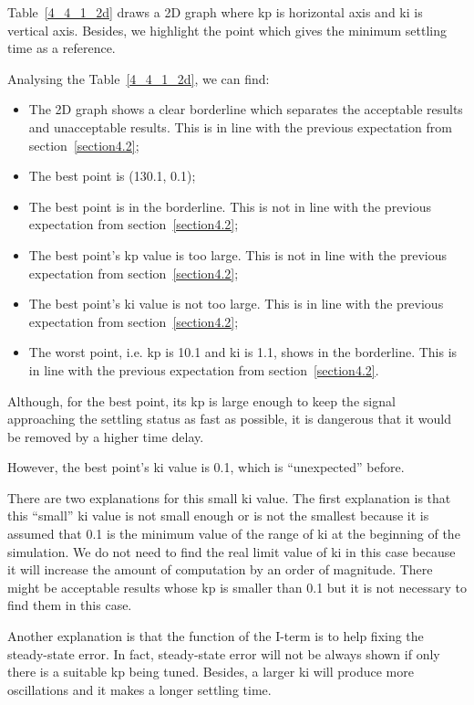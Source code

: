 Table~\ref{4_4_1_2d} draws a 2D graph where kp is horizontal axis and ki is vertical axis. Besides, we highlight the point which gives the minimum settling time as a reference. 

Analysing the Table~\ref{4_4_1_2d}, we can find: 

\begin{itemize}
\item The 2D graph shows a clear borderline which separates the acceptable results and unacceptable results. This is in line with the previous expectation from section~\ref{section4.2}; 

\item The best point is (130.1, 0.1); 

\item The best point is in the borderline.  This is not in line with the previous expectation from section~\ref{section4.2}; 

\item The best point’s kp value is too large. This is not in line with the previous expectation from section~\ref{section4.2}; 

\item The best point's ki value is not too large.  This is in line with the previous expectation from section~\ref{section4.2}; 

\item The worst point, i.e. kp is 10.1 and ki is 1.1, shows in the borderline. This is in line with the previous expectation from section~\ref{section4.2}. 
\end{itemize}

Although, for the best point, its kp is large enough to keep the signal approaching the settling status as fast as possible, it is dangerous that it would be removed by a higher time delay. 

However, the best point's ki value is 0.1, which is “unexpected” before.  

There are two explanations for this small ki value. The first explanation is that this “small” ki value is not small enough or is not the smallest because it is assumed that 0.1 is the minimum value of the range of ki at the beginning of the simulation. We do not need to find the real limit value of ki in this case because it will increase the amount of computation by an order of magnitude. There might be acceptable results whose kp is smaller than 0.1 but it is not necessary to find them in this case.  

Another explanation is that the function of the I-term is to help fixing the steady-state error. In fact, steady-state error will not be always shown if only there is a suitable kp being tuned. Besides, a larger ki will produce more oscillations and it makes a longer settling time.  


